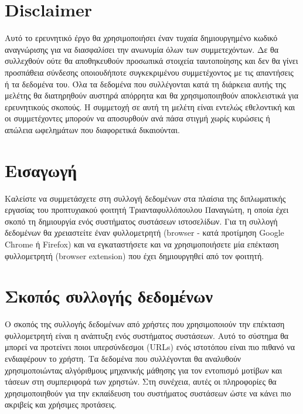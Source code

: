 \documentclass{article}
\begin{document}
\tableofcontents
\thispagestyle{empty}
\cleardoublepage

\setcounter{page}{1}
\section*{Disclaimer}

 Αυτό το ερευνητικό έργο θα χρησιμοποιήσει έναν τυχαία δημιουργημένο κωδικό αναγνώρισης για να διασφαλίσει την ανωνυμία όλων των συμμετεχόντων. Δε θα συλλεχθούν ούτε θα αποθηκευθούν προσωπικά στοιχεία ταυτοποίησης και δεν θα γίνει προσπάθεια σύνδεσης οποιουδήποτε συγκεκριμένου συμμετέχοντος με τις απαντήσεις ή τα δεδομένα του. Όλα τα δεδομένα που συλλέγονται κατά τη διάρκεια αυτής της μελέτης θα διατηρηθούν αυστηρά απόρρητα και θα χρησιμοποιηθούν αποκλειστικά για ερευνητικούς σκοπούς. Η συμμετοχή σε αυτή τη μελέτη είναι εντελώς εθελοντική και οι συμμετέχοντες μπορούν να αποσυρθούν ανά πάσα στιγμή χωρίς κυρώσεις ή απώλεια ωφελημάτων που διαφορετικά δικαιούνται.

\section*{Εισαγωγή}

Καλείστε να συμμετάσχετε στη συλλογή δεδομένων στα πλαίσια της διπλωματικής εργασίας του προπτυχιακού φοιτητή Τριανταφυλλόπουλου Παναγιώτη, η οποία έχει σκοπό τη δημιουργία ενός συστήματος συστάσεων ιστοσελίδων. Για τη συλλογή δεδομένων θα χρειαστείτε έναν φυλλομετρητή (browser - κατά προτίμηση Google Chrome ή Firefox) και να εγκαταστήσετε και να χρησιμοποιήσετε μία επέκταση φυλλομετρητή (browser extension) που έχει δημιουργηθεί από τον φοιτητή.

\section*{Σκοπός συλλογής δεδομένων}

Ο σκοπός της συλλογής δεδομένων από χρήστες που χρησιμοποιούν την επέκταση φυλλομετρητή είναι η ανάπτυξη ενός συστήματος συστάσεων. Αυτό το σύστημα θα μπορεί να προτείνει ποιοι υπερσύνδεσμοι (URLs) ενός ιστοτόπου είναι πιο πιθανό να ενδιαφέρουν το χρήστη. Τα δεδομένα που συλλέγονται θα αναλυθούν χρησιμοποιώντας αλγόριθμους μηχανικής μάθησης για τον εντοπισμό μοτίβων και τάσεων στη συμπεριφορά των χρηστών. Στη συνέχεια, αυτές οι πληροφορίες θα χρησιμοποιηθούν για την εκπαίδευση του συστήματος συστάσεων ώστε να κάνει πιο ακριβείς και χρήσιμες προτάσεις.
\end{document}
